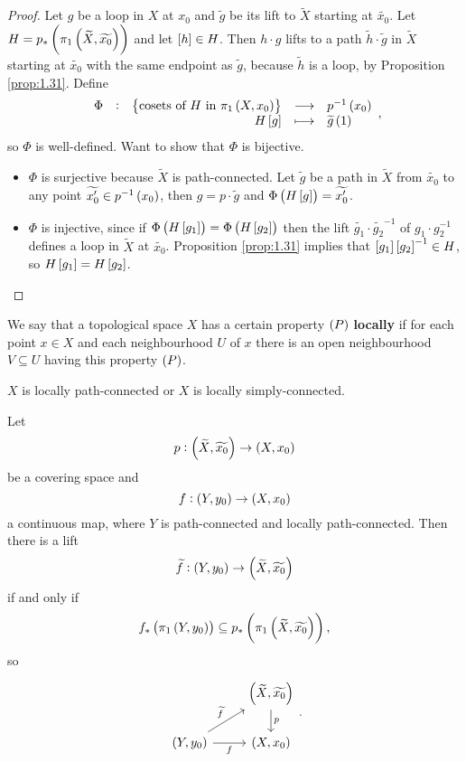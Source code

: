 \begin{proof}
Let $ g $ be a loop in $ X $ at $ x_0 $ and $ \widetilde{g} $ be its lift to $ \widetilde{X} $ starting at $ \widetilde{x_0} $. Let $ H = p_*\br{\pi_1\br{\widetilde{X}, \widetilde{x_0}}} $ and let $ \sbr{h} \in H $. Then $ h \cdot g $ lifts to a path $ \widetilde{h} \cdot \widetilde{g} $ in $ \widetilde{X} $ starting at $ \widetilde{x_0} $ with the same endpoint as $ \widetilde{g} $, because $ \widetilde{h} $ is a loop, by Proposition \ref{prop:1.31}. Define
$$ \function[\Phi]{\cbr{\text{cosets of} \ H \ \text{in} \ \pi_1\br{X, x_0}}}{p^{-1}\br{x_0}}{H\sbr{g}}{\widetilde{g}\br{1}}, $$
so $ \Phi $ is well-defined. Want to show that $ \Phi $ is bijective.
\begin{itemize}
\item $ \Phi $ is surjective because $ \widetilde{X} $ is path-connected. Let $ \widetilde{g} $ be a path in $ \widetilde{X} $ from $ \widetilde{x_0} $ to any point $ \widetilde{x_0'} \in p^{-1}\br{x_0} $, then $ g = p \cdot \widetilde{g} $ and $ \Phi\br{H\sbr{g}} = \widetilde{x_0'} $.
\item $ \Phi $ is injective, since if $ \Phi\br{H\sbr{g_1}} = \Phi\br{H\sbr{g_2}} $ then the lift $ \widetilde{g_1} \cdot \widetilde{g_2}^{-1} $ of $ g_1 \cdot g_2^{-1} $ defines a loop in $ \widetilde{X} $ at $ \widetilde{x_0} $. Proposition \ref{prop:1.31} implies that $ \sbr{g_1}\sbr{g_2}^{-1} \in H $, so $ H\sbr{g_1} = H\sbr{g_2} $.
\end{itemize}
\end{proof}

\pagebreak

We say that a topological space $ X $ has a certain property $ \br{P} $ \textbf{locally} if for each point $ x \in X $ and each neighbourhood $ U $ of $ x $ there is an open neighbourhood $ V \subseteq U $ having this property $ \br{P} $.

\begin{example*}
$ X $ is locally path-connected or $ X $ is locally simply-connected.
\end{example*}

\begin{proposition}
\label{prop:1.33}
Let
$$ p : \br{\widetilde{X}, \widetilde{x_0}} \to \br{X, x_0} $$
be a covering space and
$$ f : \br{Y, y_0} \to \br{X, x_0} $$
a continuous map, where $ Y $ is path-connected and locally path-connected. Then there is a lift
$$ \widetilde{f} : \br{Y, y_0} \to \br{\widetilde{X}, \widetilde{x_0}} $$
if and only if
$$ f_*\br{\pi_1\br{Y, y_0}} \subseteq p_*\br{\pi_1\br{\widetilde{X}, \widetilde{x_0}}}, $$
so
$$
\begin{tikzcd}
& \br{\widetilde{X}, \widetilde{x_0}} \arrow{d}{p} \\
\br{Y, y_0} \arrow{ur}{\widetilde{f}} \arrow{r}[swap]{f} & \br{X, x_0}
\end{tikzcd}.
$$
\end{proposition}

